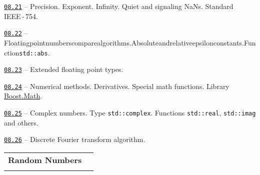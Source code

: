\documentclass[a4paper,12pt]{article}
\renewenvironment{itemize}
{
    \begin{list}{\labelitemi}
    {
      \setlength{\topsep}{0pt}
      \setlength{\partopsep}{0pt}
      \setlength{\parskip}{0pt}
      \setlength{\itemsep}{0pt}
      \setlength{\parsep}{0pt}
      \setlength{\leftmargin}{14.5pt}
    }
}{\end{list}}
\begin{document}
\begin{itemize}

    \item \href{https://github.com/i-s-m-mipt/Education/blob/master/projects/examples/source/08.21.cpp}{\texttt{08.21}} -- Precision. Exponent. Infinity. Quiet and signaling NaNs. Standard IEEE\,-\,754.

    \smallskip

    \item \href{https://github.com/i-s-m-mipt/Education/blob/master/projects/examples/source/08.22.cpp}{\texttt{08.22}} -- Floating\;point\;numbers\;compare\;algorithms.\;Absolute\;and\;relative\:epsilon\:constants.\:Function\:\lstinline{std::abs}.

    \smallskip

    \item \href{https://github.com/i-s-m-mipt/Education/blob/master/projects/examples/source/08.23.cpp}{\texttt{08.23}} -- Extended floating point types.

    \smallskip

    \item \href{https://github.com/i-s-m-mipt/Education/blob/master/projects/examples/source/08.24.cpp}{\texttt{08.24}} -- Numerical methods. Derivatives. Special math functions. Library \href{https://www.boost.org/doc/libs/1_84_0/libs/math/doc/html/index.html}{Boost.Math}.

    \smallskip

    \item \href{https://github.com/i-s-m-mipt/Education/blob/master/projects/examples/source/08.25.cpp}{\texttt{08.25}} -- Complex numbers. Type \lstinline{std::complex}. Functions \lstinline{std::real}, \lstinline{std::imag} and others.

    \smallskip

    \item \href{https://github.com/i-s-m-mipt/Education/blob/master/projects/examples/source/08.26.cpp}{\texttt{08.26}} -- Discrete Fourier transform algorithm.

\end{itemize}

\bigskip\medskip

\begin{tabular}{!{\vrule width 1pt}L{3.6cm}!{\vrule width 1pt}L{15.4cm}!{\vrule width 0pt}} 


\textbf{Random Numbers} & \\


\end{tabular}
\end{document}
